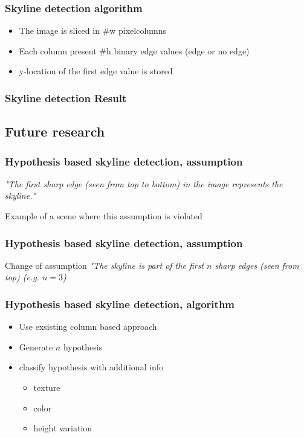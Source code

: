 \documentclass{beamer}
\begin{document}
\frame
{
	\frametitle{Skyline detection algorithm}%
	\begin{itemize}
		\item  <+-| alert@+> The image is sliced in #w pixelcolumns
		\item  <+-| alert@+> Each column present #h binary edge values (edge or no edge)
		\item  <+-| alert@+> y-location of the first edge value is stored 
	\end{itemize}
}



\frame
{
	\frametitle{Skyline detection Result}%
}

\subsection{Future research}
\frame
{
	\frametitle{Hypothesis based skyline detection, assumption}
	\emph{"The first sharp edge (seen from top to bottom) in the image represents the skyline."}
	\item  <+-| alert@+> Example of a scene where this assumption is violated
}

\frame
{
	\frametitle{Hypothesis based skyline detection, assumption}
	\item  <+-| alert@+> Change of assumption
	\emph{"The skyline is part of the first $n$ sharp edges (seen from top) (e.g.
	$n=3$)}
}

\frame
{
	\frametitle{Hypothesis based skyline detection, algorithm}
	\begin{itemize}
	\item  <+-| alert@+> Use exsisting column based approach
	\item  <+-| alert@+> Generate $n$ hypothesis
	\item  <+-| alert@+> classify hypothesis with additional info
		\begin{itemize}
		\item  <+-| alert@+> texture 
		\item  <+-| alert@+> color
		\item  <+-| alert@+> height variation 
		\end{itemize}
	\end{itemize}
}
\end{document}
